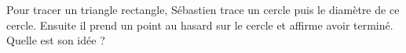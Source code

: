 
\begin{exercice}\label{exo2smath-0259}

    Pour tracer un triangle rectangle, Sébastien trace un cercle puis le diamètre de ce cercle. Ensuite il prend un point au hasard sur le cercle et affirme avoir terminé. Quelle est son idée ?

\end{exercice}
